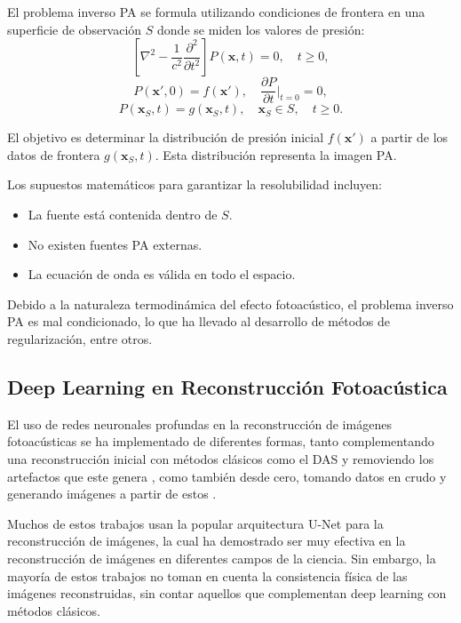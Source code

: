El problema inverso PA se formula utilizando condiciones de frontera en una superficie de observación $S$ donde se miden los valores de presión:
\begin{equation}
    \left[ \nabla^2 - \frac{1}{c^2} \frac{\partial^2}{\partial t^2} \right] P(\mathbf{x},t) = 0, \quad t \geq 0,
\end{equation}
\begin{equation}
    P(\mathbf{x}', 0) = f(\mathbf{x}'), \quad \frac{\partial P}{\partial t} \Big|_{t=0} = 0,
\end{equation}
\begin{equation}
    P(\mathbf{x}_S, t) = g(\mathbf{x}_S, t), \quad \mathbf{x}_S \in S, \quad t \geq 0.
\end{equation}

El objetivo es determinar la distribución de presión inicial $f(\mathbf{x}')$ a partir de los datos de frontera $g(\mathbf{x}_S, t)$. Esta distribución representa la imagen PA.

Los supuestos matemáticos para garantizar la resolubilidad incluyen:
\begin{itemize}
    \item La fuente está contenida dentro de $S$.
    \item No existen fuentes PA externas.
    \item La ecuación de onda es válida en todo el espacio.
\end{itemize}

Debido a la naturaleza termodinámica del efecto fotoacústico, el problema inverso PA es mal condicionado, lo que ha llevado al desarrollo de métodos de regularización, entre otros.

\subsection{Deep Learning en Reconstrucción Fotoacústica}

El uso de redes neuronales profundas en la reconstrucción de imágenes fotoacústicas se ha implementado de diferentes formas, tanto complementando una reconstrucción inicial con métodos clásicos como el DAS y removiendo los artefactos que este genera \cite{guan2020fully}, como también desde cero, tomando datos en crudo y generando imágenes a partir de estos \cite{Yang2021}.

Muchos de estos trabajos usan la popular arquitectura U-Net \cite{ronneberger2015unet} para la reconstrucción de imágenes, la cual ha demostrado ser muy efectiva en la reconstrucción de imágenes en diferentes campos de la ciencia. Sin embargo, la mayoría de estos trabajos no toman en cuenta la consistencia física de las imágenes reconstruidas, sin contar aquellos que complementan deep learning con métodos clásicos.

